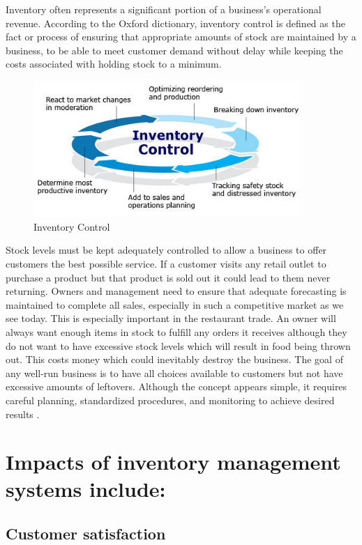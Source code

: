 Inventory often represents a significant portion of a business’s operational revenue. According to the Oxford dictionary, inventory control is defined as the fact or process of ensuring that appropriate amounts of stock are maintained by a business, to be able to meet customer demand without delay while keeping the costs associated with holding stock to a minimum.

\begin{figure}[h!]
	\caption{Inventory Control}
	\label{image:myImageName}
	\centering
	\includegraphics[width=0.9\textwidth]{Fig images/inventory-control.jpg}
\end{figure}

Stock levels must be kept adequately controlled to allow a business to offer customers the best possible service. If a customer visits any retail outlet to purchase a product but that product is sold out it could lead to them never returning. Owners and management need to ensure that adequate forecasting is maintained to complete all sales, especially in such a competitive market as we see today. This is especially important in the restaurant trade. An owner will always want enough items in stock to fulfill any orders it receives although they do not want to have excessive stock levels which will result in food being thrown out. This costs money which could inevitably destroy the business. The goal of any well-run business is to have all choices available to customers but not have excessive amounts of leftovers. Although the concept appears simple, it requires careful planning, standardized procedures, and monitoring to achieve desired results \cite{INV}.

\section{Impacts of inventory management systems include:}

\subsection{Customer satisfaction}

